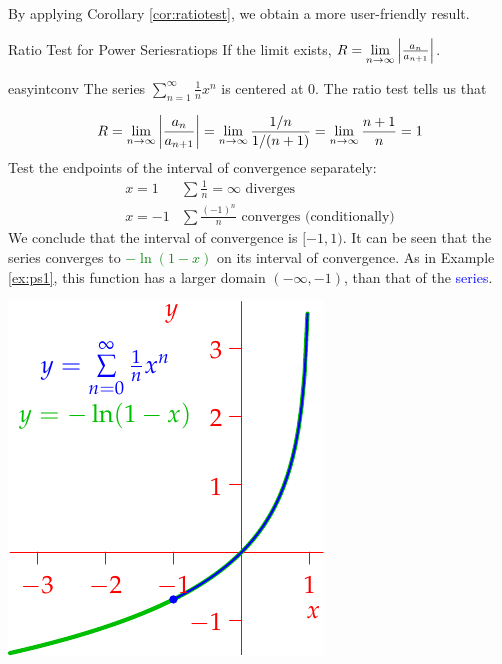 By applying Corollary \ref{cor:ratiotest}, we obtain a more user-friendly result.

\begin{cor}{Ratio Test for Power Series}{ratiops}
If the limit exists, $R=\lim\limits_{n\to\infty}\left| \frac{a_n}{a_{n+1}}\right|$.
\end{cor}\goodbreak


\begin{examples}{}{easyintconv}
\exstart The series $\sum\limits_{n=1}^\infty \frac 1nx^n$ is centered at $0$. The ratio test tells us that
\begin{enumerate}\setcounter{enumi}{1}\itemsep1pt
  \begin{minipage}[t]{0.65\linewidth}\vspace{-15pt}
  \item[]
  \[R=\lim_{n\to\infty}\left| \frac{a_n}{a_{n+1}}\right|=\lim_{n\to\infty}\frac{1/n}{1/(n+1)} =\lim_{n\to\infty}\frac{n+1}{n}=1\]
  Test the endpoints of the interval of convergence separately:
  \[\begin{array}{ll}
  x=1&\sum \frac 1n=\infty\text{ diverges}\\[5pt]
  x=-1&\sum \frac{(-1)^n}n\text{ converges (conditionally)}
  \end{array}\]
  We conclude that the interval of convergence is $[-1,1)$.\medbreak
  It can be seen that the series converges to \textcolor{Green}{$-\ln(1-x)$} on its interval of convergence. As in Example \ref{ex:ps1}, this function has a larger domain $(-\infty,-1)$, than that of the \textcolor{blue}{series}.
	\end{minipage}\begin{minipage}[t]{0.35\linewidth}\vspace{0pt}
	\flushright\includegraphics{powerseriesex2}
	\end{minipage}
	

\end{enumerate}
\end{examples}
